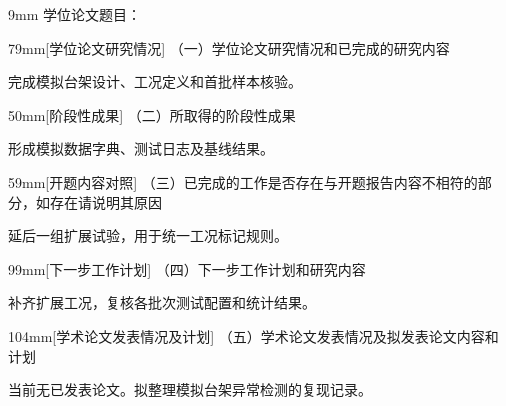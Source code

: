 \documentclass{sdjummidterm}
\begin{document}
\clearpage
{}
\begin{formbox}{9mm}
\noindent 学位论文题目：
\end{formbox}
\begin{formbox}{79mm}[学位论文研究情况]
\noindent（一）学位论文研究情况和已完成的研究内容\par
完成模拟台架设计、工况定义和首批样本核验。
\end{formbox}
\begin{formbox}{50mm}[阶段性成果]
\noindent（二）所取得的阶段性成果\par
形成模拟数据字典、测试日志及基线结果。
\end{formbox}
\begin{formbox}{59mm}[开题内容对照]
\noindent（三）已完成的工作是否存在与开题报告内容不相符的部分，如存在请说明其原因\par
延后一组扩展试验，用于统一工况标记规则。
\end{formbox}

\clearpage
\begin{formbox}{99mm}[下一步工作计划]
\noindent（四）下一步工作计划和研究内容\par
补齐扩展工况，复核各批次测试配置和统计结果。
\end{formbox}
\begin{formbox}{104mm}[学术论文发表情况及计划]
\noindent（五）学术论文发表情况及拟发表论文内容和计划\par
当前无已发表论文。拟整理模拟台架异常检测的复现记录。
\end{formbox}
\end{document}
